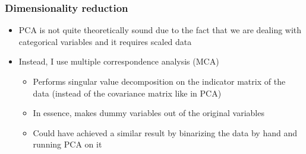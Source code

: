 \documentclass{beamer}
\begin{document}
\begin{frame}
\frametitle{Dimensionality reduction}
	\begin{itemize}
		\item PCA is not quite theoretically sound due to the fact that we are dealing with categorical variables and it requires scaled data
		\item Instead, I use multiple correspondence analysis (MCA)
		\begin{itemize}
			\item Performs singular value decomposition on the indicator matrix of the data (instead of the covariance matrix like in PCA)
			\item In essence, makes dummy variables out of the original variables
			\item Could have achieved a similar result by binarizing the data by hand and running PCA on it
		\end{itemize}
	\end{itemize}
\end{frame}

\end{document}

